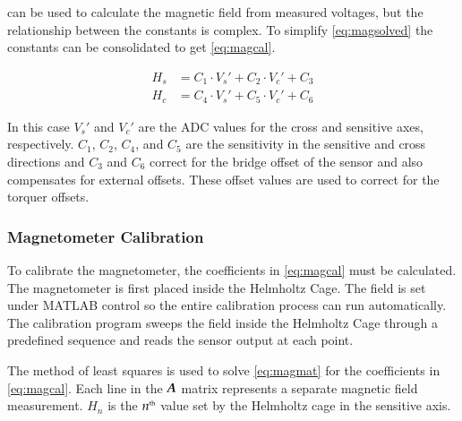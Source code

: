  can be used to calculate the magnetic field from measured voltages, but the relationship between the constants is complex. To simplify \cref{eq:magsolved} the constants can be consolidated to get \cref{eq:magcal}.

\begin{equation}
    \label{eq:magcal}
    \begin{split}
        H_s &= C_1 \cdot V_s' + C_2 \cdot V_c' + C_3\\
        H_c &= C_4 \cdot V_s' + C_5 \cdot V_c' + C_6
    \end{split}
\end{equation}

In this case $V_s'$ and $V_c'$ are the \ac{ADC} values for the cross and sensitive axes, respectively. $C_1$, $C_2$, $C_4$, and $C_5$ are the sensitivity in the sensitive and cross directions and $C_3$ and $C_6$ correct for the bridge offset of the sensor and also compensates for external offsets. These offset values are used to correct for the torquer offsets.

\subsubsection{Magnetometer Calibration}

To calibrate the magnetometer, the coefficients in \cref{eq:magcal} must be calculated. The magnetometer is first placed inside the Helmholtz Cage. The field is set under MATLAB control so the entire calibration process can run automatically. The calibration program sweeps the field inside the Helmholtz Cage through a predefined sequence and reads the sensor output at each point. 

The method of least squares is used to solve \cref{eq:magmat} for the coefficients in \cref{eq:magcal}. Each line in the $\boldsymbol{A}$ matrix represents a separate magnetic field measurement. $H_n$ is the $n^{\text{\tiny th}}$ value set by the Helmholtz cage in the sensitive axis. 

